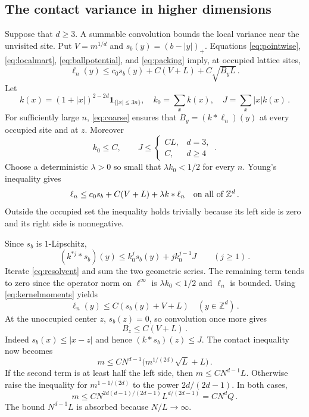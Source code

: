 \documentclass[11pt]{amsart}
\theoremstyle{plain}
\theoremstyle{definition}
\newcommand{\Z}{\mathbb Z}
\newcommand{\ind}{\mathbf 1}
\begin{document}
\subsection{The contact variance in higher dimensions}
Suppose that $d\geq3$. A summable convolution bounds the local variance
near the unvisited site.
Put $V=m^{1/d}$ and $s_b(y)=(b-|y|)_+$. Equations
\eqref{eq:pointwise}, \eqref{eq:localmart}, \eqref{eq:ballpotential}, and
\eqref{eq:packing} imply, at occupied lattice sites,
\[
 \ell_n(y)\leq c_0s_b(y)+C(V+L)+C\sqrt{B_yL}\, .
\]
Let
\[
 k(x)=(1+|x|)^{2-2d}\ind_{\{|x|\leq3n\}},\quad
 k_0=\sum_xk(x),\quad J=\sum_x|x|k(x)\, .
\]
For sufficiently large $n$, \eqref{eq:coarse} ensures that
$B_y=(k*\ell_n)(y)$ at every occupied site and at $z$.
Moreover
\begin{equation}\label{eq:kernelmoments}
 k_0\leq C,\qquad
 J\leq\begin{cases}CL,&d=3,\\C,&d\geq4\end{cases}\, .
\end{equation}
Choose a deterministic $\lambda>0$ so small that
$\lambda k_0<1/2$ for every $n$. Young's inequality gives
\begin{equation}\label{eq:resolvent}
 \ell_n\leq c_0s_b+C(V+L)+\lambda k*\ell_n
 \quad\hbox{on all of }\Z^d\, .
\end{equation}
Outside the occupied set the inequality holds trivially because its
left side is zero and its right side is nonnegative.

Since $s_b$ is $1$-Lipschitz,
\[
 (k^{*j}*s_b)(y)\leq k_0^j s_b(y)+j k_0^{j-1}J\qquad(j\geq1)\, .
\]
Iterate \eqref{eq:resolvent} and sum the two geometric series. The remaining
term tends to zero since the operator norm on $\ell^\infty$ is
$\lambda k_0<1/2$ and $\ell_n$ is bounded.
Using \eqref{eq:kernelmoments} yields
\begin{equation}\label{eq:envelopehigh}
 \ell_n(y)\leq C(s_b(y)+V+L)\quad(y\in\Z^d)\, .
\end{equation}
At the unoccupied center $z$, $s_b(z)=0$, so convolution once more gives
\begin{equation}\label{eq:holebracket}
 B_z\leq C(V+L)\, .
\end{equation}
Indeed $s_b(x)\leq|x-z|$ and hence $(k*s_b)(z)\leq J$.
The contact inequality now becomes
\[
 m\leq CN^{d-1}\big(m^{1/(2d)}\sqrt L+L\big)\, .
\]
If the second term is at least half the left side, then
$m\leq CN^{d-1}L$. Otherwise raise the inequality for
$m^{1-1/(2d)}$ to the power $2d/(2d-1)$. In both cases,
\begin{equation}\label{eq:masshigh}
 m\leq CN^{2d(d-1)/(2d-1)}L^{d/(2d-1)}
       =CN^d Q\, .
\end{equation}
The bound $N^{d-1}L$ is absorbed because $N/L\to\infty$.
\end{document}
